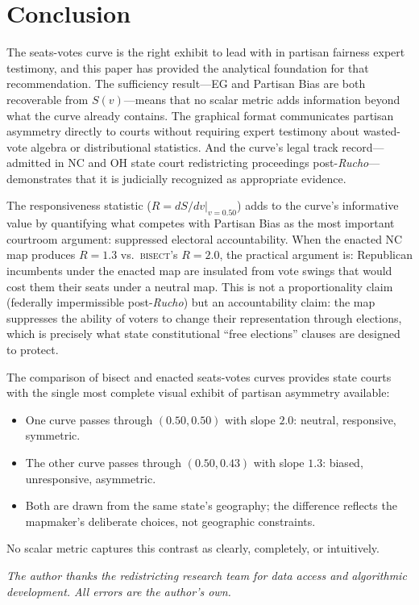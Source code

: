 \section{Conclusion}
\label{sec:conclusion}

The seats-votes curve is the right exhibit to lead with in partisan fairness expert
testimony, and this paper has provided the analytical foundation for that recommendation.
The sufficiency result---EG and Partisan Bias are both recoverable from $S(v)$---means
that no scalar metric adds information beyond what the curve already contains. The
graphical format communicates partisan asymmetry directly to courts without requiring
expert testimony about wasted-vote algebra or distributional statistics. And the
curve's legal track record---admitted in NC and OH state court redistricting
proceedings post-\textit{Rucho}---demonstrates that it is judicially recognized
as appropriate evidence.

The responsiveness statistic ($R = dS/dv|_{v=0.50}$) adds to the curve's informative
value by quantifying what competes with Partisan Bias as the most important courtroom
argument: suppressed electoral accountability. When the enacted NC map produces $R = 1.3$
vs.\ \textsc{bisect}'s $R = 2.0$, the practical argument is: Republican incumbents
under the enacted map are insulated from vote swings that would cost them their seats
under a neutral map. This is not a proportionality claim (federally impermissible
post-\textit{Rucho}) but an accountability claim: the map suppresses the ability of
voters to change their representation through elections, which is precisely what
state constitutional ``free elections'' clauses are designed to protect.

The comparison of bisect and enacted seats-votes curves provides state courts with
the single most complete visual exhibit of partisan asymmetry available:
\begin{itemize}
\item One curve passes through $(0.50, 0.50)$ with slope $2.0$: neutral, responsive,
  symmetric.
\item The other curve passes through $(0.50, 0.43)$ with slope $1.3$: biased,
  unresponsive, asymmetric.
\item Both are drawn from the same state's geography; the difference reflects
  the mapmaker's deliberate choices, not geographic constraints.
\end{itemize}
No scalar metric captures this contrast as clearly, completely, or intuitively.

\bigskip

\noindent\textit{The author thanks the redistricting research team for data
access and algorithmic development. All errors are the author's own.}
